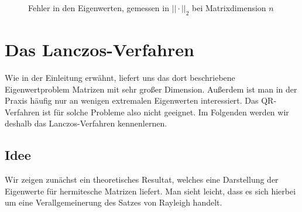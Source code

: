 \documentclass{article}
\begin{document}
\begin{theorem}
\begin{figure}[H]
  \centering
  \qquad
  \caption{Fehler in den Eigenwerten, gemessen in $||\cdot||_2$ bei Matrixdimension $n$}%
  \label{Error_QR}
\end{figure}

\section{Das Lanczos-Verfahren}
Wie in der Einleitung erwähnt, liefert uns das dort beschriebene Eigenwertproblem Matrizen mit sehr großer Dimension. Außerdem ist man in der Praxis häufig nur an wenigen extremalen Eigenwerten interessiert. Das QR-Verfahren ist für solche Probleme also nicht geeignet. Im Folgenden werden wir deshalb das Lanczos-Verfahren kennenlernen.

\subsection{Idee}

Wir zeigen zunächst ein theoretisches Resultat, welches eine Darstellung der Eigenwerte für hermitesche Matrizen liefert. Man sieht leicht, dass es sich hierbei um eine Verallgemeinerung des Satzes von Rayleigh handelt.


\end{theorem}
\end{document}
